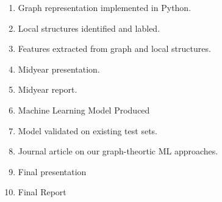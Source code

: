 \begin{enumerate}
\item Graph representation implemented in Python. 
\item Local structures identified and labled. 
\item Features extracted from graph and local structures.
\item Midyear presentation.
\item Midyear report. 
\item Machine Learning Model Produced
\item Model validated on existing test sets.  
\item Journal article on our graph-theortic ML approaches.
\item Final presentation
\item Final Report

\end{enumerate}
